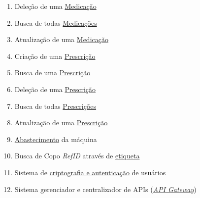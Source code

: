 \begin{apendicesenv}
\begin{enumerate}
    \item Deleção de uma \href{https://github.com/PillWatcher/pillwatcher-dpb-patient-service/blob/master/src/main/java/br/com/pillwatcher/dpb/services/impl/MedicationServiceImpl.java#L82}{Medicação}
    \item Busca de todas \href{https://github.com/PillWatcher/pillwatcher-dpb-patient-service/blob/master/src/main/java/br/com/pillwatcher/dpb/services/impl/MedicationServiceImpl.java#L82}{Medicações}
    \item Atualização de uma \href{https://github.com/PillWatcher/pillwatcher-dpb-patient-service/blob/master/src/main/java/br/com/pillwatcher/dpb/services/impl/MedicationServiceImpl.java#L108}{Medicação}
    \item Criação de uma \href{https://github.com/PillWatcher/pillwatcher-dpb-patient-service/blob/master/src/main/java/br/com/pillwatcher/dpb/services/impl/PrescriptionServiceImpl.java#L36}{Prescrição}
    \item Busca de uma \href{https://github.com/PillWatcher/pillwatcher-dpb-patient-service/blob/master/src/main/java/br/com/pillwatcher/dpb/services/impl/PrescriptionServiceImpl.java#L82}{Prescrição}
    \item Deleção de uma \href{https://github.com/PillWatcher/pillwatcher-dpb-patient-service/blob/master/src/main/java/br/com/pillwatcher/dpb/services/impl/PrescriptionServiceImpl.java#L52}{Prescrição}
    \item Busca de todas \href{https://github.com/PillWatcher/pillwatcher-dpb-patient-service/blob/master/src/main/java/br/com/pillwatcher/dpb/services/impl/PrescriptionServiceImpl.java#L69}{Prescrições}
    \item Atualização de uma \href{https://github.com/PillWatcher/pillwatcher-dpb-patient-service/blob/master/src/main/java/br/com/pillwatcher/dpb/services/impl/MedicationServiceImpl.java#L108}{Prescrição}
    \item \href{https://github.com/PillWatcher/pillwatcher-dpb-patient-service/blob/master/src/main/java/br/com/pillwatcher/dpb/services/impl/SupplyServiceImpl.java#L27}{Abastecimento} da máquina
    \item Busca de Copo \textit{RefID} através de \href{https://github.com/PillWatcher/pillwatcher-dpb-patient-service/blob/master/src/main/java/br/com/pillwatcher/dpb/services/impl/CupServiceImpl.java#L25}{etiqueta} 
    \item Sistema de \href{https://github.com/PillWatcher/pillwatcher-dpb-auth-server}{criptografia e autenticação} de usuários
    \item Sistema gerenciador e centralizador de APIs (\href{https://github.com/PillWatcher/pillwatcher-api-gateway}{\textit{API Gateway}}) 
\end{enumerate}


\end{apendicesenv}

